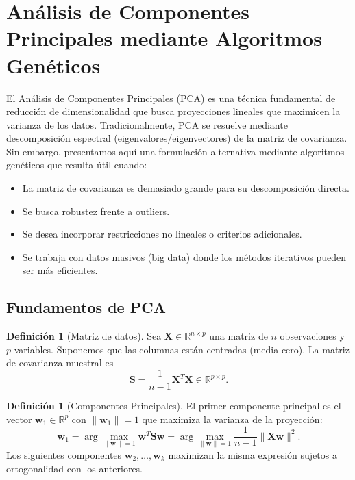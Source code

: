 \documentclass[11pt,a4paper]{article}
\theoremstyle{plain}
\theoremstyle{definition}
\newtheorem{definition}[theorem]{Definición}
\theoremstyle{remark}
\newcommand{\1}{\mathbf{1}}
\begin{document}
\section{Análisis de Componentes Principales mediante Algoritmos Genéticos}
\label{sec:pca_ga}

El Análisis de Componentes Principales (PCA) es una técnica fundamental de reducción de dimensionalidad que busca proyecciones lineales que maximicen la varianza de los datos. Tradicionalmente, PCA se resuelve mediante descomposición espectral (eigenvalores/eigenvectores) de la matriz de covarianza. Sin embargo, presentamos aquí una formulación alternativa mediante algoritmos genéticos que resulta útil cuando:
\begin{itemize}
\item La matriz de covarianza es demasiado grande para su descomposición directa.
\item Se busca robustez frente a outliers.
\item Se desea incorporar restricciones no lineales o criterios adicionales.
\item Se trabaja con datos masivos (big data) donde los métodos iterativos pueden ser más eficientes.
\end{itemize}

\subsection{Fundamentos de PCA}

\begin{definition}[Matriz de datos]
Sea $\mathbf{X} \in \mathbb{R}^{n \times p}$ una matriz de $n$ observaciones y $p$ variables. Suponemos que las columnas están centradas (media cero). La matriz de covarianza muestral es
\[
\mathbf{S} = \frac{1}{n-1} \mathbf{X}^T \mathbf{X} \in \mathbb{R}^{p \times p}.
\]
\end{definition}

\begin{definition}[Componentes Principales]
El primer componente principal es el vector $\mathbf{w}_1 \in \mathbb{R}^p$ con $\|\mathbf{w}_1\| = 1$ que maximiza la varianza de la proyección:
\[
\mathbf{w}_1 = \arg\max_{\|\mathbf{w}\|=1} \mathbf{w}^T \mathbf{S} \mathbf{w} = \arg\max_{\|\mathbf{w}\|=1} \frac{1}{n-1} \|\mathbf{X} \mathbf{w}\|^2.
\]
Los siguientes componentes $\mathbf{w}_2, \ldots, \mathbf{w}_k$ maximizan la misma expresión sujetos a ortogonalidad con los anteriores.
\end{definition}
\end{document}
